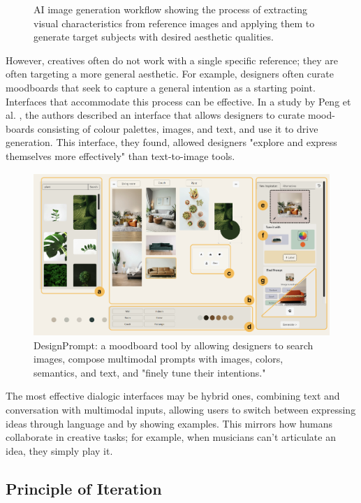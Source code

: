 \begin{figure}[htbp]
    \caption{AI image generation workflow showing the process of extracting visual characteristics from reference images and applying them to generate target subjects with desired aesthetic qualities.}
    \label{fig:ai_generation_workflow}
\end{figure}

However, creatives often do not work with a single specific reference; they are often targeting a more general aesthetic. For example, designers often curate moodboards that seek to capture a general intention as a starting point. Interfaces that accommodate this process can be effective. In a study by Peng et al. \cite{Peng2024-tr}, the authors described an interface that allows designers to curate mood-boards consisting of colour palettes, images, and text, and use it to drive generation. This interface, they found, allowed designers "explore and express themselves more effectively" than text-to-image tools.

\begin{figure}
    \centering
    \includegraphics[width=1\linewidth]{designprompt.png}
    \caption{DesignPrompt: a moodboard tool by \cite{Peng2024-tr} allowing designers to search images, compose multimodal prompts with images, colors, semantics, and text, and "finely tune their intentions."}
    \label{fig:enter-label}
\end{figure}

The most effective dialogic interfaces may be hybrid ones, combining text and conversation with multimodal inputs, allowing users to switch between expressing ideas through language and by showing examples. This mirrors how humans collaborate in creative tasks; for example, when musicians can't articulate an idea, they simply play it.


\subsection{Principle of Iteration}

